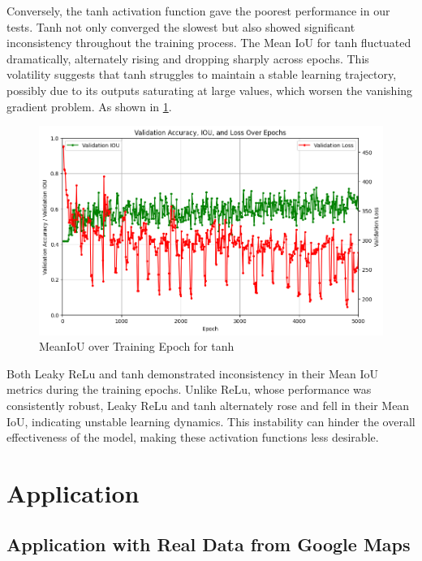 \documentclass[conference]{IEEEtran}
\begin{document}
Conversely, the tanh activation function gave the poorest performance in our tests. Tanh not only converged the slowest but also showed significant inconsistency throughout the training process. The Mean IoU for tanh fluctuated dramatically, alternately rising and dropping sharply across epochs. This volatility suggests that tanh struggles to maintain a stable learning trajectory, possibly due to its outputs saturating at large values, which worsen the vanishing gradient problem. As shown in \ref{fig:perf_tanh}.
\begin{figure}[!t]
    \centering
    \includegraphics[width=\columnwidth]{tanh_perf.png} %
    \caption{MeanIoU over Training Epoch for tanh}
    \label{fig:perf_tanh}
\end{figure}

Both Leaky ReLu and tanh demonstrated inconsistency in their Mean IoU metrics during the training epochs. Unlike ReLu, whose performance was consistently robust, Leaky ReLu and tanh alternately rose and fell in their Mean IoU, indicating unstable learning dynamics. This instability can hinder the overall effectiveness of the model, making these activation functions less desirable.





\section{Application}
\subsection{Application with Real Data from Google Maps}
\end{document}
